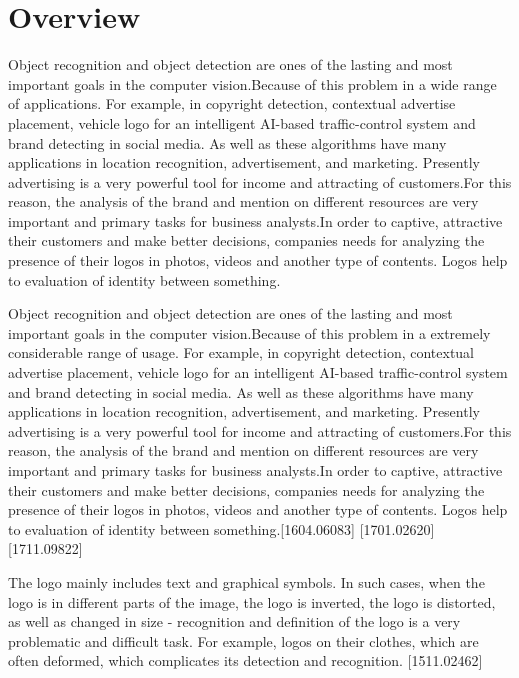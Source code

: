 \section{Overview} \label{sec:1.1}
\vspace{-0.5cm}
\noindent Object recognition and object detection are ones of the lasting and most important goals in the computer vision.Because of this problem in a wide range of applications. For example, in copyright detection, contextual advertise placement, vehicle logo for an intelligent AI-based traffic-control system and brand detecting in social media. As well as these algorithms have many applications in location recognition, advertisement, and marketing. Presently advertising is a very powerful tool for income and attracting of customers.For this reason, the analysis of the brand and mention on different resources are very important and primary tasks for business analysts.In order to captive, attractive their customers and make better decisions, companies needs for analyzing the presence of their logos in photos, videos and another type of contents. Logos help to evaluation of identity between something. 

\vspace{-0.5cm}

\noindent 

\par Object recognition and object detection are ones of the lasting and most important goals in the computer vision.Because of this problem in a extremely considerable range of usage. For example, in copyright detection, contextual advertise placement, vehicle logo for an intelligent AI-based traffic-control system and brand detecting in social media. As well as these algorithms have many applications in location recognition, advertisement, and marketing. Presently advertising is a very powerful tool for income and attracting of customers.For this reason, the analysis of the brand and mention on different resources are very important and primary tasks for business analysts.In order to captive, attractive their customers and make better decisions, companies needs for analyzing the presence of their logos in photos, videos and another type of contents. Logos help to evaluation of identity between something.[1604.06083] [1701.02620] [1711.09822]

\vspace{-0.5cm}
\par The logo mainly includes text and graphical symbols. In such cases, when the logo is in different parts of the image, the logo is inverted, the logo is distorted, as well as changed in size - recognition and definition of the logo is a very problematic and difficult task. For example, logos on their clothes, which are often deformed, which complicates its detection and recognition. [1511.02462]

